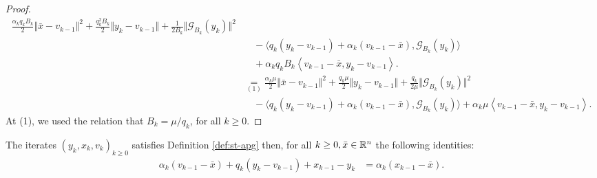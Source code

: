 \documentclass[12pt]{article}
\begin{document}
\begin{proof}
\begin{align*}
                \frac{\alpha_k q_k B_k}{2}\Vert \bar x - v_{k - 1}\Vert^2
                + \frac{q_k^2B_k}{2}\Vert y_k - v_{k - 1} \Vert
                + \frac{1}{2B_k}\Vert \mathcal G_{B_k}(y_k)\Vert^2
                    \\ &\quad 
                    - \langle
                        q_k(y_k - v_{k - 1}) + \alpha_k(v_{k - 1} - \bar x), \mathcal G_{B_k}(y_k)
                    \rangle
                    \\ &\quad 
                    + \alpha_k q_k B_k
                    \left\langle 
                        v_{k - 1} - \bar x, 
                        y_k - v_{k - 1}
                    \right\rangle. 
                \\
                &\underset{(1)}{=} 
                \frac{\alpha_k \mu}{2}
                \Vert \bar x - v_{k - 1}\Vert^2
                + \frac{q_k\mu}{2}\Vert y_k - v_{k - 1} \Vert
                + \frac{q_k}{2\mu}\Vert \mathcal G_{B_k}(y_k)\Vert^2
                    \\ &\quad 
                - \langle
                        q_k(y_k - v_{k - 1}) + \alpha_k(v_{k - 1} - \bar x), \mathcal G_{B_k}(y_k)
                    \rangle
                    + \alpha_k \mu
                    \left\langle 
                        v_{k - 1} - \bar x, 
                        y_k - v_{k - 1}
                    \right\rangle. 
            \end{align*}
            At (1), we used the relation that $B_k = \mu/q_k$, for all $k \ge 0$. 
        \end{proof}
        \begin{lemma}\label{lemma:cnvg-prep-part2}
            The iterates $(y_k, x_k, v_k)_{k \ge 0}$ satisfies Definition \ref{def:st-apg} then, for all $k \ge 0, \bar x \in \mathbb R^n$ the following identities: 
            \begin{align*}
                \alpha_k(v_{k - 1} - \bar x) 
                + q_k(y_k - v_{k - 1})
                + x_{k - 1} - y_k
                &= 
                \alpha_k(x_{k - 1} - \bar x). 
            \end{align*}
        \end{lemma}
\end{document}

